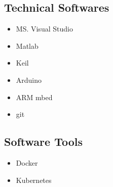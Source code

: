 \documentclass[10pt,a4paper,sans]{moderncv} %
\newcommand*{\authorimg}[1]{%
	\raisebox{-.3\baselineskip}{%
		\texttt{[image: \#1]}%
	}%
}
\begin{document}
\subsection{Technical Softwares}
\begin{multicols}{4}
	\begin{itemize}
		\item \authorimg{pictures/visual.png} MS. Visual Studio
		\vspace{5pt}
		\item \authorimg{pictures/matlab.jpg} Matlab
		\vspace{5pt}
		\item \authorimg{pictures/Keil.png} Keil
		\vspace{5pt}
		\item \authorimg{pictures/arduino.png} Arduino
		\vspace{5pt}
		\item \authorimg{pictures/arm-mbed.png} ARM mbed
		\vspace{5pt}
		\item \authorimg{pictures/git.png} git
	\end{itemize}
\end{multicols}

\subsection{Software Tools}
\begin{multicols}{4}
	\begin{itemize}
		\item \authorimg{pictures/docker.jpeg} Docker
		\vspace{5pt}
		\item \authorimg{pictures/Kubernetes.png} Kubernetes
		\vspace{5pt}
	\end{itemize}
\end{multicols}
\end{document}
